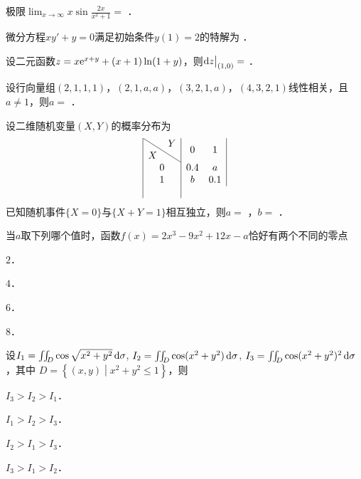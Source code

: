 \documentclass[plain,noanswer,medmath]{../../template/jnuexam}
\begin{document}






\begin{problem}
极限$\lim_{x \to \infty} x\sin \frac{2x}{x^2 + 1} =$ \fillin{}．
\end{problem}


\begin{problem}
微分方程$xy' + y = 0$满足初始条件$y(1) = 2$的特解为 \fillin{}．
\end{problem}


\begin{problem}
设二元函数$z = x\mathrm{e}^{x + y} + (x + 1)\ln(1 + y)$，则$\mathop{}\!\mathrm{d} z\big|_{(1,0)} =$ \fillin{}．
\end{problem}


\begin{problem}
设行向量组$(2,1,1,1)$，$(2,1,a,a)$，$(3,2,1,a)$，$(4,3,2,1)$线性相关，且$a \ne 1$，则$a =$ \fillin{}．
\end{problem}




\begin{problem}
设二维随机变量$(X,Y)$的概率分布为
$$\begin{array}{|c|cc|}
\hline
  \diagboxtwo{X}{Y} &   0 & 1 \\
\hline
                  0 & 0.4 & a \\
                  1 &   b & 0.1 \\
\hline
\end{array}$$
已知随机事件$\{X = 0\}$与$\{X + Y = 1\}$相互独立，则$a=$ \fillin{}，$b=$ \fillin{}．
\end{problem}




\begin{problem}
当$a$取下列哪个值时，函数$f(x) = 2x^3 - 9x^2 + 12x - a$恰好有两个不同的零点\pickout{}
\begin{abcd}
\item $2$．
\item $4$．
\item $6$．
\item $8$．
\end{abcd}
\end{problem}


\begin{problem}
设$I_1 = \iint_D \cos \sqrt{x^2 + y^2} \d\sigma$, $I_2 = \iint_D \cos(x^2 + y^2)\d\sigma$,
$I_3 = \iint_D \cos(x^2 + y^2)^2 \d\sigma$，其中
$D = \left\{(x,y) \middle| x^2 + y^2 \le 1 \right\}$，则\pickout{}
\begin{abcd}
\item $I_3 > I_2 > I_1$．
\item $I_1 > I_2 > I_3$．
\item $I_2 > I_1 > I_3$．
\item $I_3 > I_1 > I_2$．
\end{abcd}
\end{problem}
\end{document}
